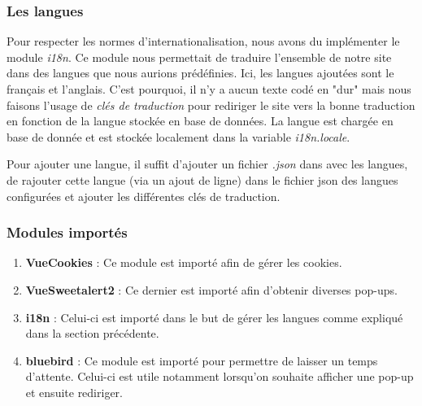 \subsubsection{Les langues}
\begin{flushleft}
    Pour respecter les normes d'internationalisation, nous avons du implémenter le module \textit{i18n}. Ce module nous permettait de traduire l'ensemble de notre site dans des langues que nous aurions prédéfinies. Ici, les langues ajoutées sont le français et l'anglais. C'est pourquoi, il n'y a aucun texte codé en "dur" mais nous faisons l'usage de \textit{clés de traduction} pour rediriger le site vers la bonne traduction en fonction de la langue stockée en base de données. La langue est chargée en base de donnée et est stockée localement dans la variable \textit{i18n.locale}.
\end{flushleft}
\begin{flushleft}
    Pour ajouter une langue, il suffit d'ajouter un fichier \textit{.json} dans avec les langues, de rajouter cette langue (via un ajout de ligne) dans le fichier json des langues configurées et ajouter les différentes clés de traduction.
\end{flushleft}

\subsubsection{Modules importés}
\begin{enumerate}[-]
\item \textbf{VueCookies} :\newline
Ce module est importé afin de gérer les cookies.
\item \textbf{VueSweetalert2} :\newline
Ce dernier est importé afin d'obtenir diverses pop-ups.
\item \textbf{i18n} :\newline
Celui-ci est importé dans le but de gérer les langues comme expliqué dans la section précédente.
\item \textbf{bluebird} :\newline
Ce module est importé pour permettre de laisser un temps d'attente.\newline
Celui-ci est utile notamment lorsqu'on souhaite afficher une pop-up et ensuite rediriger.
\end{enumerate} 
